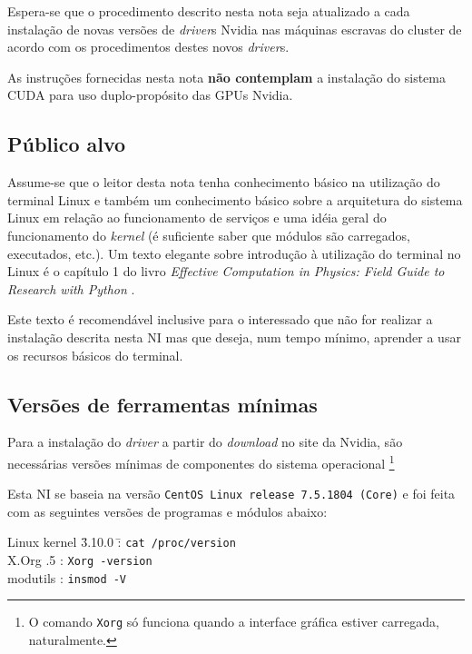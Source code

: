 \documentclass[twoside,a4paper,12pt,english]{inac17}
\begin{document}
Espera-se que o procedimento descrito nesta nota seja atualizado 
a cada instalação de novas versões de \textit{driver}s Nvidia nas máquinas 
escravas do cluster de acordo com os procedimentos destes novos 
\textit{driver}s.

As instruções fornecidas nesta nota \textbf{não contemplam} a 
instalação do sistema CUDA para uso duplo-propósito das GPUs 
Nvidia.

\subsection{Público alvo}

Assume-se que o leitor desta nota tenha conhecimento básico na utilização do 
terminal Linux e também um conhecimento básico sobre a arquitetura do sistema 
Linux em relação ao funcionamento de serviços e uma idéia geral do funcionamento 
do \textit{kernel} (é suficiente saber que módulos são carregados, executados, etc.).
Um texto elegante sobre introdução à utilização do terminal no Linux é o capítulo 
1 do livro \textit{Effective Computation in Physics: Field Guide to Research with Python} \cite{Scopatz2015}.

Este texto é recomendável inclusive para o interessado que não for realizar a instalação descrita nesta NI mas que deseja, num tempo mínimo, aprender a usar 
os recursos básicos do terminal.

\subsection{Versões de ferramentas mínimas}

Para a instalação do \textit{driver} a partir do \textit{download} 
no site da Nvidia, são necessárias versões mínimas de componentes 
do sistema operacional \footnote{O comando \texttt{Xorg} só funciona 
quando a interface gráfica estiver carregada, naturalmente.} 

Esta NI se baseia na versão \texttt{CentOS Linux release 7.5.1804 (Core)} 
e foi feita com as seguintes versões de programas e módulos abaixo:

\begin{tabbing}
Linux kernel \= 3.10.0 \= : \= \texttt{cat /proc/version} \\
X.Org .5 \> : \> \texttt{Xorg -version} \\
modutils  \> : \> \texttt{insmod -V}
\end{tabbing}
\end{document}
